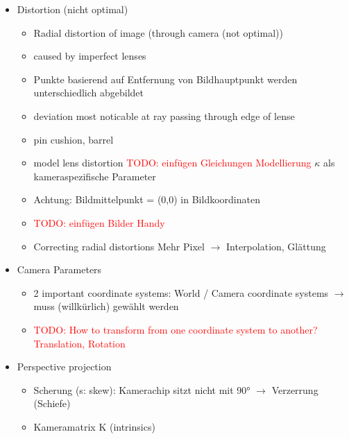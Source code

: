 \documentclass{report}
\newcommand{\todo}[2][red]{\textcolor{#1}{TODO: #2}}
\begin{document}
\begin{itemize}
\begin{itemize}
			\item 
			\item 
		\end{itemize}
		
		\item Distortion (nicht optimal)
		\begin{itemize}
			\item Radial distortion of image (through camera (not optimal))
			\item caused by imperfect lenses
			\item Punkte basierend auf Entfernung von Bildhauptpunkt werden unterschiedlich abgebildet
			\item deviation most noticable at ray passing through edge of lense
			\item pin cushion, barrel\newline

			\item model lens distortion
			\newline \todo{einfügen Gleichungen Modellierung}\newline
			\newline $\kappa$ als kameraspezifische Parameter
			
			\item Achtung: Bildmittelpunkt = (0,0) in Bildkoordinaten
			\item \todo{einfügen Bilder Handy}\newline
			
			\item Correcting radial distortions
			\newline Mehr Pixel $\rightarrow$ Interpolation, Glättung
		\end{itemize}
	
		\item Camera Parameters
		\begin{itemize}
			\item 2 important coordinate systems: World / Camera coordinate systems
			\newline $\rightarrow$ muss (willkürlich) gewählt werden
			\item \todo{How to transform from one coordinate system to another? Translation, Rotation}
		\end{itemize}
	
		\item Perspective projection
		\begin{itemize}
			\item Scherung (s: skew): Kamerachip sitzt nicht mit 90° $\rightarrow$ Verzerrung (Schiefe)
			\item Kameramatrix K (intrinsics)
		\end{itemize}
	

\end{itemize}
\end{document}
